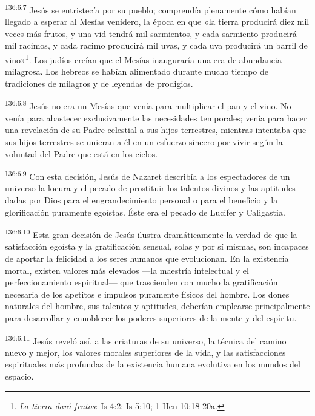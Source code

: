 \par
\textsuperscript{136:6.7} Jesús se entristecía por su pueblo; comprendía plenamente cómo habían llegado a esperar al Mesías venidero, la época en que «la tierra producirá diez mil veces más frutos, y una vid tendrá mil sarmientos, y cada sarmiento producirá mil racimos, y cada racimo producirá mil uvas, y cada uva producirá un barril de vino»\footnote{\textit{La tierra dará frutos}: Is 4:2; Is 5:10; 1 Hen 10:18-20a.}. Los judíos creían que el Mesías inauguraría una era de abundancia milagrosa. Los hebreos se habían alimentado durante mucho tiempo de tradiciones de milagros y de leyendas de prodigios.

\par
\textsuperscript{136:6.8} Jesús no era un Mesías que venía para multiplicar el pan y el vino. No venía para abastecer exclusivamente las necesidades temporales; venía para hacer una revelación de su Padre celestial a sus hijos terrestres, mientras intentaba que sus hijos terrestres se unieran a él en un esfuerzo sincero por vivir según la voluntad del Padre que está en los cielos.

\par
\textsuperscript{136:6.9} Con esta decisión, Jesús de Nazaret describía a los espectadores de un universo la locura y el pecado de prostituir los talentos divinos y las aptitudes dadas por Dios para el engrandecimiento personal o para el beneficio y la glorificación puramente egoístas. Éste era el pecado de Lucifer y Caligastia.

\par
\textsuperscript{136:6.10} Esta gran decisión de Jesús ilustra dramáticamente la verdad de que la satisfacción egoísta y la gratificación sensual, solas y por sí mismas, son incapaces de aportar la felicidad a los seres humanos que evolucionan. En la existencia mortal, existen valores más elevados ---la maestría intelectual y el perfeccionamiento espiritual--- que trascienden con mucho la gratificación necesaria de los apetitos e impulsos puramente físicos del hombre. Los dones naturales del hombre, sus talentos y aptitudes, deberían emplearse principalmente para desarrollar y ennoblecer los poderes superiores de la mente y del espíritu.

\par
\textsuperscript{136:6.11} Jesús reveló así, a las criaturas de su universo, la técnica del camino nuevo y mejor, los valores morales superiores de la vida, y las satisfacciones espirituales más profundas de la existencia humana evolutiva en los mundos del espacio.

